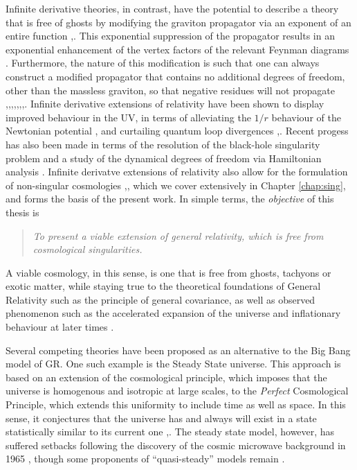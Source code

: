 

Infinite derivative theories, in contrast, have the potential to describe a theory that is free of ghosts by modifying the graviton propagator via an exponent of an entire function \cite{Biswas:2005qr},\cite{Biswas:2011ar}. This exponential suppression of the propagator results in an exponential enhancement of the vertex factors of the relevant Feynman diagrams \cite{Talaganis:2016ovm}. Furthermore, the nature of this modification is such that one can always construct a modified propagator that contains no additional degrees of freedom, other than the massless graviton, so that negative residues will not propagate \cite{Biswas:2005qr},\cite{Biswas:2011ar},\cite{Biswas:2010zk},\cite{Conroy:2016sac},\cite{Conroy:2014dja},\cite{Chialva:2014rla},\cite{Biswas:2012bp},\cite{Craps:2014wga}. Infinite derivative extensions of relativity have been shown to display improved behaviour in the UV, in terms of alleviating the $1/r$ behaviour of the Newtonian potential \cite{Biswas:2011ar}, and curtailing quantum loop divergences \cite{Talaganis:2014ida},\cite{Talaganis:2015wva}. Recent progess has also been made in terms of the resolution of the black-hole singularity problem \cite{Frolov:2016pav} and a study of the dynamical degrees of freedom via Hamiltonian analysis \cite{Mazumdar:2017kxr}. Infinite derivatve extensions of relativity also allow for the formulation of non-singular cosmologies \cite{Conroy:2016sac},\cite{Conroy:2014dja}, which we cover extensively in Chapter \ref{chap:sing}, and forms the basis of the present work.  In simple terms, the \emph{objective} of this thesis is 
\begin{quote}
\emph{To present a viable extension of general relativity, which is free from cosmological singularities.}
\end{quote}
A viable cosmology, in this sense, is one that is free from ghosts, tachyons or exotic matter, while staying true to the theoretical foundations of General Relativity such as the principle of general covariance, as well as observed phenomenon such as the accelerated expansion of the universe and inflationary behaviour at later times \cite{Borde:2001nh}.

Several competing theories have been proposed as an alternative to the Big Bang model of GR. One such example is the Steady State universe. This approach is based on an extension of the cosmological principle, which imposes that the universe is homogenous and isotropic at large scales, to the \emph{Perfect} Cosmological Principle, which extends this uniformity to include time as well as space. In this sense, it conjectures that the universe has and always will exist in a state statistically similar to its current one \cite{Bondi:1948qk},\cite{Bondi:1954qj}. The steady state model, however, has suffered setbacks following the discovery of the cosmic microwave background in 1965  \cite{Weinberg:100595}, though some proponents of ``quasi-steady'' models remain \cite{Aguirre:2001ks}. 

